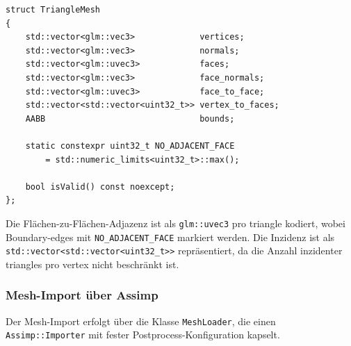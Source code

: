                 \begin{lstlisting}[style=cppStyle, caption={Indizierte Dreiecksrepräsentation \texttt{TriangleMesh}.}, label={lst:impl-medusa-trianglemesh}]
struct TriangleMesh
{
    std::vector<glm::vec3>             vertices;
    std::vector<glm::vec3>             normals;
    std::vector<glm::uvec3>            faces;
    std::vector<glm::vec3>             face_normals;
    std::vector<glm::uvec3>            face_to_face;
    std::vector<std::vector<uint32_t>> vertex_to_faces;
    AABB                               bounds;

    static constexpr uint32_t NO_ADJACENT_FACE
        = std::numeric_limits<uint32_t>::max();

    bool isValid() const noexcept;
};
                \end{lstlisting}

                Die Flächen-zu-Flächen-Adjazenz ist als \texttt{glm::uvec3} pro \gls{triangle} kodiert, wobei Boundary-\glspl{edge} mit \texttt{NO\_ADJACENT\_FACE} markiert werden.
                Die Inzidenz ist als \texttt{std::vector<std::vector<uint32\_t>>} repräsentiert, da die Anzahl inzidenter \glspl{triangle} pro \gls{vertex} nicht beschränkt ist.

            \subsubsection{Mesh-Import über Assimp}\label{subsubsec:impl-medusa-mesh-import}
                Der Mesh-Import erfolgt über die Klasse \texttt{MeshLoader}, die einen \texttt{Assimp::Importer} mit fester Postprocess-Konfiguration kapselt.

